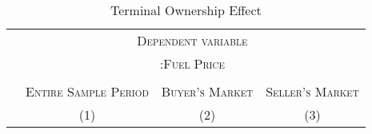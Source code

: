 \documentclass[12pt]{article}
\begin{document}
\begin{table}[htbp]\centering
\def\sym#1{\ifmmode^{#1}\else\(^{#1}\)\fi}
\caption{Terminal Ownership Effect\label{tab1}}
\renewcommand{\arraystretch}{0.6}
\begin{tabular}{l*{3}{c}}
\toprule
 & \multicolumn{3}{c}{\textsc{Dependent variable}} \\ 
                     &\multicolumn{3}{c}{\textsc{:Fuel Price}}\\
                                          \cline{2-4}  \\
                  &\multicolumn{1}{c}{\textsc{Entire Sample Period}}&\multicolumn{1}{c}{\textsc{Buyer's Market}}&\multicolumn{1}{c}{\textsc{Seller's Market}}\\                                          
                    &\multicolumn{1}{c}{(1)}&\multicolumn{1}{c}{(2)}&\multicolumn{1}{c}{(3)}\\


\end{tabular}
\end{table}
\end{document}
